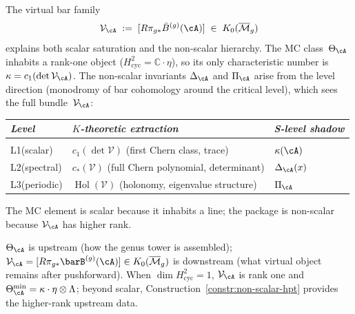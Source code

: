 \begin{remark}
\label{rem:structural-saturation}
The virtual bar family
\begin{equation}\label{eq:virtual-bar-family}
\mathcal{V}_{\cA}
\;:=\;
[R\pi_{g*} \bar{B}^{(g)}(\cA)]
\;\in\; K_0(\overline{\mathcal{M}}_g)
\end{equation}
explains both scalar saturation and the non-scalar hierarchy.
The MC class~$\Theta_{\cA}$ inhabits a rank-one object
($H^2_{\mathrm{cyc}} = \mathbb{C}\cdot\eta$), so its only
characteristic number is $\kappa = c_1(\det\mathcal{V}_{\cA})$.
The non-scalar invariants $\Delta_{\cA}$ and $\Pi_{\cA}$ arise
from the level direction (monodromy of bar cohomology around the
critical level), which sees the full bundle~$\mathcal{V}_{\cA}$:

\begin{center}\renewcommand{\arraystretch}{1.3}
\begin{tabular}{@{}lll@{}}
\emph{Level} & \emph{$K$-theoretic extraction}
  & \emph{S-level shadow} \\[2pt]
\hline
\\[-6pt]
L1\;\textup{(scalar)}
  & $c_1(\det \mathcal{V})$
    \textup{(}first Chern class, trace\textup{)}
  & $\kappa(\cA)$ \\
L2\;\textup{(spectral)}
  & $c_*(\mathcal{V})$
    \textup{(}full Chern polynomial, determinant\textup{)}
  & $\Delta_{\cA}(x)$ \\
L3\;\textup{(periodic)}
  & $\operatorname{Hol}(\mathcal{V})$
    \textup{(}holonomy, eigenvalue structure\textup{)}
  & $\Pi_{\cA}$
\end{tabular}
\end{center}
The MC element is scalar because it inhabits a line;
the package is non-scalar because $\mathcal{V}_{\cA}$ has
higher rank.
\end{remark}

\begin{remark}
\label{rem:theta-vs-VA}
$\Theta_\cA$ is upstream (how the genus tower is assembled);
$\mathcal{V}_\cA=[R\pi_{g*}\barB^{(g)}(\cA)]\in K_0(\overline{\mathcal{M}}_g)$
is downstream (what virtual object remains after pushforward).
When $\dim H^2_{\mathrm{cyc}}=1$, $\mathcal{V}_\cA$ is rank one
and $\Theta_\cA^{\min}=\kappa\cdot\eta\otimes\Lambda$;
beyond scalar, Construction~\ref{constr:non-scalar-hpt} provides
the higher-rank upstream data.
\end{remark}

